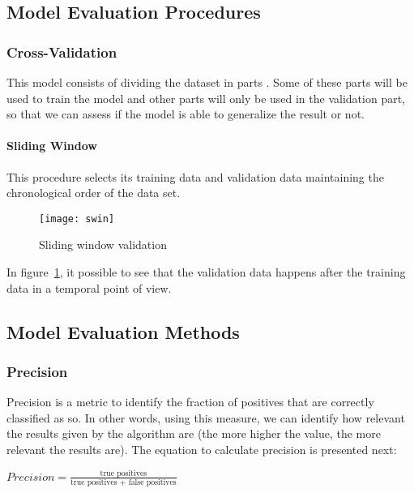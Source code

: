 \subsection{Model Evaluation Procedures}
\subsubsection{Cross-Validation}

This model consists of dividing the dataset in parts \cite{Witten:2005:DMP:1205860}
. Some of these parts will be used to train the model and other parts will only
be used in the validation part, so that we can assess if the model is able to
generalize the result or not. 

\paragraph{Sliding Window}

This procedure selects its training data and validation data maintaining the
chronological order of the data set\cite{Bensch_self-learningprediction}.

\begin{figure}[!h]
  \begin{center}
    \leavevmode
    \texttt{[image: swin]}
    \caption{Sliding window validation}
    \label{fig:swin}
  \end{center}
\end{figure}
\FloatBarrier

In figure~\ref{fig:swin}, it possible to see that the validation data happens
after the training data in a temporal point of view.

\subsection{Model Evaluation Methods}

\subsubsection{Precision}

Precision is a metric to identify the fraction of positives that are correctly
classified as so. In other words, using this measure, we can identify how relevant the
results given by the algorithm are (the more higher the value, the more relevant
the results are). The equation to calculate precision is presented next:

\begin{center}
\Large
\begin{math}
Precision = \frac{\text{true positives}}{\text{true positives + false positives}}
\end{math}
\normalsize
\end{center}


